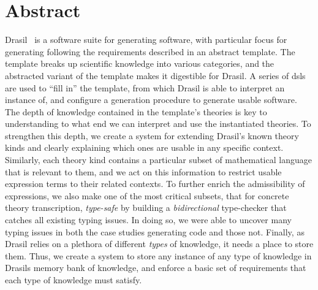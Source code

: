 \chapter{Abstract}
\label{chap:abstract}

Drasil~\cite{Drasil2021} is a software suite for generating software, with
particular focus for generating  following the requirements described
in an abstract  template. The template breaks up scientific knowledge
into various categories, and the abstracted variant of the template makes it
digestible for Drasil. A series of \acsp{dsl} are used to ``fill in'' the
template, from which Drasil is able to interpret an instance of, and configure a
generation procedure to generate usable software. The depth of knowledge
contained in the template's theories is key to understanding to what end we can
interpret and use the instantiated theories. To strengthen this depth, we create
a system for extending Drasil's known theory kinds and clearly explaining which
ones are usable in any specific context. Similarly, each theory kind contains a
particular subset of mathematical language that is relevant to them, and we act
on this information to restrict usable expression terms to their related
contexts. To further enrich the admissibility of expressions, we also make one
of the most critical subsets, that for concrete theory transcription,
\textit{type-safe} by building a \textit{bidirectional} type-checker that
catches all existing typing issues. In doing so, we were able to uncover many
typing issues in both the case studies generating code and those not. Finally,
as Drasil relies on a plethora of different \textit{types} of knowledge, it
needs a place to store them. Thus, we create a system to store any instance of
any type of knowledge in Drasils memory bank of knowledge, and enforce a basic
set of requirements that each type of knowledge must satisfy.
